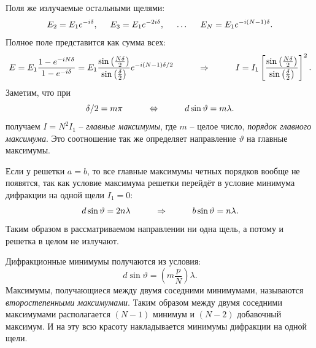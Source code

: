 Поля же излучаемые остальными щелями:
\begin{equation*}
	E_2 = E_1 e^{-i \delta}, 
	\hspace{0.5 cm}
	E_3 = E_1 e^{-2i \delta},
	\hspace{0.5 cm}
	\ldots
	\hspace{0.5 cm}
	E_N = E_1 e^{- i (N-1)\delta}.
\end{equation*}
Полное поле представится как сумма всех:
\begin{equation*}
	E = E_1 \frac{1- e^{- i N \delta}}{1 - e^{-i\delta}} = E_1 \frac{\sin \left(\frac{N \delta}{2}\right)}{\sin \left(\frac{\delta}{2}\right)}e^{- i (N-1)\delta/2}
	\hspace{1 cm}
	\Rightarrow
	\hspace{1 cm}
	I = I_1 \left[\frac{\sin \left(\frac{N \delta}{2}\right)}{\sin \left(\frac{\delta}{2}\right)}\right]^2.
\end{equation*}
Заметим, что при  
\begin{equation*}
	\delta/2 = m \pi
	\hspace{1 cm}
	\Leftrightarrow
	\hspace{1 cm}
	d \sin \vartheta = m \lambda.
\end{equation*}
получаем $I = N^2 I_1$ -- \textit{главные максимумы}, где $m$ -- целое число, \textit{порядок главного максимума}. Это соотношение так же определяет направление $\vartheta$ на главные максимумы.

Если у решетки $a = b$, то все главные максимумы четных порядков вообще не появятся, так как условие максимума решетки перейдёт в условие минимума дифракции на одной щели $I_1=0$:
\begin{equation*}
	d \sin \vartheta = 2 n \lambda
	\hspace{1 cm}
	\Rightarrow
	\hspace{1 cm}
	b \sin \vartheta = n \lambda.
\end{equation*}
Таким образом в рассматриваемом направлении ни одна щель, а потому и решетка в целом не излучают.

Дифракционные минимумы получаются из условия:
\begin{equation*}
	d \sin \vartheta = \left(m \frac{p}{N}\right)\lambda.
\end{equation*}
Максимумы, получающиеся между двумя соседними минимумами, называются \textit{второстепенными максимумами}. 
Таким образом между двумя соседними максимумами располагается $(N-1)$ минимум и $(N-2)$ добавочный максимум. И на эту всю красоту накладывается минимумы дифракции на одной щели.

